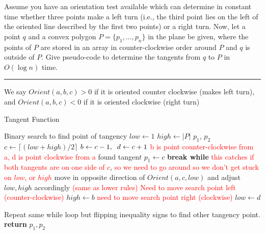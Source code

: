 \documentclass[11pt]{article}
\begin{document}

Assume you have an orientation test available which can determine in constant
time whether three points make a left turn (i.e., the third point lies on the
left of the oriented line described by the first two points) or a right turn.
Now, let a point $q$ and a convex polygon $P = \{ p_1, \ldots , p_n \}$ in the
plane be given, where the points of $P$ are stored in an array in
counter-clockwise order around $P$ and $q$ is outside of $P$. Give pseudo-code
to determine the tangents from $q$ to $P$ in $O(\log n)$ time.

\hrule

We say $Orient(a,b,c) > 0$ if it is oriented counter clockwise (makes left turn), and $Orient(a,b,c) < 0$ if it is oriented clockwise (right turn)

\begin{algorithm}
    \caption{Tangent Function}
    \label{alg:prob1}
    \begin{algorithmic}[1]
        \State Binary search to find point of tangency
        \State $low \gets 1$
        \State $high \gets |P|$
        \State $p_1$, $p_2$
            \State $c \gets \lceil (low + high)/2 \rceil$
            \State $b \gets c-1, \sp d \gets c + 1$ \quad \textcolor{red}{b is point counter-clockwise from a, d is point clockwise from a}
                \State found tangen$t$
                \State $p_1 \gets c$
                \State \textbf{break while}
                \State \textcolor{red}{this catches if both tangents are on one side of $c$}, 
                \State \textcolor{red}{so we need to go around so we don't get stuck on $low$, or $high$}
                \State move in opposite direction of $Orient(a, c, low)$ and adjust $low, high$ accordingly 
                \State \textcolor{red}{(same as lower rules)}
                \State \textcolor{red}{Need to move search point left (counter-clockwise)}
                \State $high \gets b$
                \State \textcolor{red}{need to move search point right (clockwise)}
                \State $low \gets d$
            \EndIf
        \EndWhile

        \State Repeat same while loop but flipping inequality signs to find other tangency point.
        \State \textbf{return} $p_1, p_2$
    \EndFunction
    \end{algorithmic}
\end{algorithm}
\end{document}
